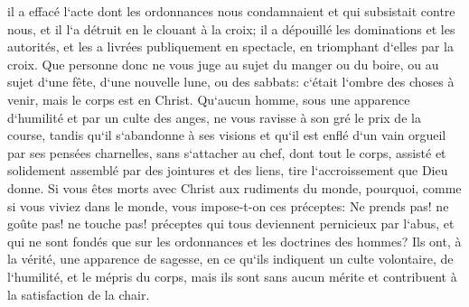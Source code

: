 \verse il a effacé l`acte dont les ordonnances nous condamnaient et qui subsistait contre nous, et il l`a détruit en le clouant à la croix; 
\verse il a dépouillé les dominations et les autorités, et les a livrées publiquement en spectacle, en triomphant d`elles par la croix. 
\verse Que personne donc ne vous juge au sujet du manger ou du boire, ou au sujet d`une fête, d`une nouvelle lune, ou des sabbats: 
\verse c`était l`ombre des choses à venir, mais le corps est en Christ. 
\verse Qu`aucun homme, sous une apparence d`humilité et par un culte des anges, ne vous ravisse à son gré le prix de la course, tandis qu`il s`abandonne à ses visions et qu`il est enflé d`un vain orgueil par ses pensées charnelles, 
\verse sans s`attacher au chef, dont tout le corps, assisté et solidement assemblé par des jointures et des liens, tire l`accroissement que Dieu donne. 
\verse Si vous êtes morts avec Christ aux rudiments du monde, pourquoi, comme si vous viviez dans le monde, vous impose-t-on ces préceptes: 
\verse Ne prends pas! ne goûte pas! ne touche pas! 
\verse préceptes qui tous deviennent pernicieux par l`abus, et qui ne sont fondés que sur les ordonnances et les doctrines des hommes? 
\verse Ils ont, à la vérité, une apparence de sagesse, en ce qu`ils indiquent un culte volontaire, de l`humilité, et le mépris du corps, mais ils sont sans aucun mérite et contribuent à la satisfaction de la chair. 

